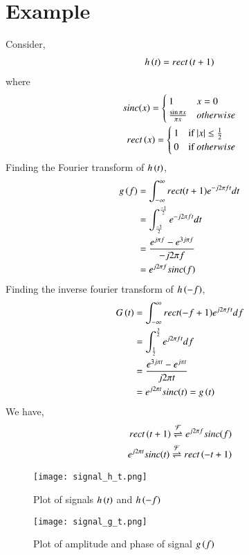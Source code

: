 \documentclass[journal,12pt,twocolumn]{IEEEtran}
\begin{document}
\section*{Example}
Consider,
\begin{align}
    h\left(t\right) = rect\left(t+1\right)
\end{align}
where
\begin{align}
sinc{\left(x\right)} =
    \begin{cases}
    1 & x = 0\\
    \frac{\sin{\pi x}}{\pi x} & otherwise
    \end{cases}\\
rect\left(x\right) =
    \begin{cases}
    1 & \text{if } |x| \leq \frac{1}{2}\\
    0 & \text{if } otherwise
    \end{cases}
\end{align}
Finding the Fourier transform of $h\left(t\right)$,
\begin{align}
    g\left(f\right) &= \int_{-\infty}^{\infty} rect(t+1)e^{-j2\pi ft}dt\\
    &= \int_{\frac{-3}{2}}^{\frac{-1}{2}}e^{-j2\pi ft}dt\\
    &= \frac{e^{j\pi f} - e^{3j\pi f}}{-j2\pi f}\\
    &= e^{j2\pi f}sinc{\left(f\right)}
\end{align}
Finding the inverse fourier transform of $h\left(-f\right)$,
\begin{align}
    G\left(t\right) &= \int_{-\infty}^{\infty} rect(-f+1)e^{j2\pi ft}df\\
    &= \int_{\frac{1}{2}}^{\frac{3}{2}}e^{j2\pi ft}df\\
    &= \frac{e^{3j\pi t} - e^{j\pi t}}{j2\pi t}\\
    &= e^{j2\pi t}sinc{\left(t\right)} = g\left(t\right)
\end{align}
We have,
\begin{align}
    rect\left(t+1\right) \overset{\mathcal{F}}{ \rightleftharpoons} e^{j2\pi f}sinc{\left(f\right)}\\
    e^{j2\pi t}sinc{\left(t\right)} \overset{\mathcal{F}}{ \rightleftharpoons} rect\left(-t+1\right)
\end{align}
\begin{figure}[h]
    \centering
    \texttt{[image: signal\_h\_t.png]}
    \caption{Plot of signals $h\left(t\right)$ and $h\left(-f\right)$}
    \label{fig:figure1}
\end{figure}
\begin{figure}[h]
    \centering
    \texttt{[image: signal\_g\_t.png]}
    \caption{Plot of amplitude and phase of signal $g\left(f\right)$}
    \label{fig:figure2}
\end{figure}
\end{document}
